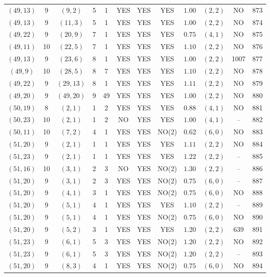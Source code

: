 \begin{longtable}{|c|c|c|c|c|c|c|c|c|c|c|c|}
$(49,13)$ & 9 & $(9,2)$ & 5 & 1 & YES & YES & YES & $1.00$ & $(2,2)$ & NO & 873\\
$(49,13)$ & 9 & $(11,3)$ & 5 & 1 & YES & YES & YES & $1.00$ & $(2,2)$ & NO & 874\\
$(49,22)$ & 9 & $(20,9)$ & 7 & 1 & YES & YES & YES & $0.75$ & $(4,1)$ & NO & 875\\
$(49,11)$ & 10 & $(22,5)$ & 7 & 1 & YES & YES & YES & $1.10$ & $(2,2)$ & NO & 876\\
$(49,13)$ & 9 & $(23,6)$ & 8 & 1 & YES & YES & YES & $1.00$ & $(2,2)$ & 1007 & 877\\
$(49,9)$ & 10 & $(28,5)$ & 8 & 7 & YES & YES & YES & $1.10$ & $(2,2)$ & NO & 878\\
$(49,22)$ & 9 & $(29,13)$ & 8 & 1 & YES & YES & YES & $1.11$ & $(2,2)$ & NO & 879\\
$(49,20)$ & 9 & $(49,20)$ & 9 & 49 & YES & YES & YES & $1.00$ & $(2,2)$ & NO & 880\\
$(50,19)$ & 8 & $(2,1)$ & 1 & 2 & YES & YES & YES & $0.88$ & $(4,1)$ & NO & 881\\
$(50,23)$ & 10 & $(2,1)$ & 1 & 2 & NO & YES & YES & $1.00$ & $(4,1)$ & -- & 882\\
$(50,11)$ & 10 & $(7,2)$ & 4 & 1 & YES & YES & NO(2) & $0.62$ & $(6,0)$ & NO & 883\\
$(51,20)$ & 9 & $(2,1)$ & 1 & 1 & YES & YES & YES & $1.11$ & $(2,2)$ & NO & 884\\
$(51,23)$ & 9 & $(2,1)$ & 1 & 1 & YES & YES & YES & $1.22$ & $(2,2)$ & -- & 885\\
$(51,16)$ & 10 & $(3,1)$ & 2 & 3 & NO & YES & NO(2) & $1.30$ & $(2,2)$ & -- & 886\\
$(51,20)$ & 9 & $(3,1)$ & 2 & 3 & YES & YES & NO(2) & $0.75$ & $(6,0)$ & -- & 887\\
$(51,20)$ & 9 & $(4,1)$ & 3 & 1 & YES & YES & NO(2) & $0.75$ & $(6,0)$ & NO & 888\\
$(51,20)$ & 9 & $(5,1)$ & 4 & 1 & YES & YES & YES & $1.10$ & $(2,2)$ & -- & 889\\
$(51,20)$ & 9 & $(5,1)$ & 4 & 1 & YES & YES & NO(2) & $0.75$ & $(6,0)$ & NO & 890\\
$(51,20)$ & 9 & $(5,2)$ & 3 & 1 & YES & YES & YES & $1.20$ & $(2,2)$ & 639 & 891\\
$(51,23)$ & 9 & $(6,1)$ & 5 & 3 & YES & YES & NO(2) & $1.20$ & $(2,2)$ & NO & 892\\
$(51,23)$ & 9 & $(6,1)$ & 5 & 3 & YES & YES & NO(2) & $1.20$ & $(2,2)$ & -- & 893\\
$(51,20)$ & 9 & $(8,3)$ & 4 & 1 & YES & YES & NO(2) & $0.75$ & $(6,0)$ & NO & 894\\

\end{longtable}
